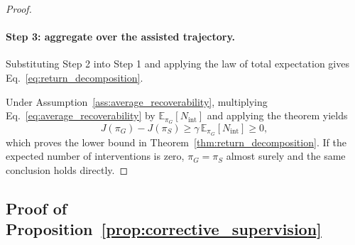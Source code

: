 \begin{proof}
\paragraph{Step 3: aggregate over the assisted trajectory.}
Substituting Step 2 into Step 1 and applying the law of total expectation gives Eq.~\ref{eq:return_decomposition}.

Under Assumption~\ref{ass:average_recoverability}, multiplying
Eq.~\ref{eq:average_recoverability} by
$\mathbb E_{\pi_G}[N_{\mathrm{int}}]$ and applying the theorem yields
\[
J(\pi_G)-J(\pi_S)
\ge\gamma\,\mathbb E_{\pi_G}[N_{\mathrm{int}}]\ge0,
\]
which proves the lower bound in Theorem~\ref{thm:return_decomposition}. If the expected number of
interventions is zero, $\pi_G=\pi_S$ almost surely and the same conclusion
holds directly.
\end{proof}

\subsection{Proof of Proposition~\ref{prop:corrective_supervision}}
\label{app:proof_corrective_supervision}

